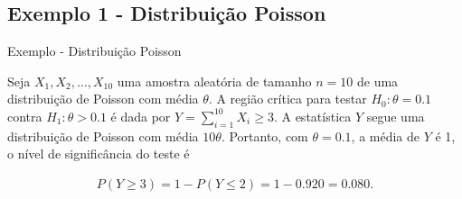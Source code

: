 \documentclass[12pt]{beamer}
\begin{document}
%
%
%


\subsection{Exemplo 1 - Distribuição Poisson}
\begin{frame}{Exemplo - Distribuição Poisson}
	\begin{block}{}
		\justifying
		Seja $X_1, X_2, \ldots, X_{10}$ uma amostra aleatória de tamanho $n = 10$ de uma distribuição de Poisson com média $\theta$. A região crítica para testar $H_0 : \theta = 0.1$ contra $H_1 : \theta > 0.1$ é dada por $Y = {\displaystyle \sum_{i=1}^{10}} X_i \geq 3$. A estatística $Y$ segue uma distribuição de Poisson com média $10\theta$. Portanto, com $\theta = 0.1$, a média de $Y$ é 1, o nível de significância do teste é
		
		\begin{align*}
			P(Y \geq 3) = 1 - P(Y \leq 2) = 1 - 0.920 = 0.080.
		\end{align*}
	\end{block}
\end{frame}
\end{document}
